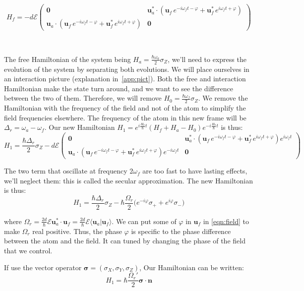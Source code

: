 \documentclass[10pt]{report}
\theoremstyle{plain}
\theoremstyle{definition}
\theoremstyle{remark}
\newcommand{\braket}[2]{\langle#1|#2\rangle}
\newcommand{\mat}[1]{\begin{pmatrix}#1\end{pmatrix}}
\newcommand{\bs}{\boldsymbol}
\begin{document}
\[ H_f = -d\mathcal{E} \mat{\bs 0 &
  \bs u_a^* \cdot (\bs u_f\, e^{-i\omega_f t-\varphi} + \bs u_f^*\,
  e^{i\omega_f t + \varphi})\\
\bs u_a \cdot (\bs u_f\, e^{-i\omega_f t-\varphi} + \bs u_f^*\,
  e^{i\omega_f t + \varphi}) & \bs 0
}\]

\

The free Hamiltonian of the system being $H_a = \frac{\hbar \omega_a}2 \sigma_Z$,
we'll need to express the evolution of the system by separating both evolutions.
We will place ourselves in an interaction picture (explanation
in~\cref{app:pict}). Both the free and interaction Hamiltonian make the state turn
around, and we want to see the difference between the two of them. Therefore, we
will remove $H_0 = \frac{\hbar \omega_f}2 \sigma_Z$. We remove the Hamiltonian
with the frequency of the field and not of the atom to simplify the field
frequencies elsewhere. The frequency of the atom in this new frame will be
$\Delta_r = \omega_a - \omega_f$.
Our new Hamiltonian $H_1 = e^{i\frac{H_0}\hbar t}(H_f + H_a - H_0)e^{-i\frac{H_0}\hbar t}$ is thus:
\[H_1 = \frac{\hbar \Delta_r}2 \sigma_Z -
  d\mathcal{E} \mat{\bs 0 &
    \bs u_a^* \cdot (\bs u_f\, e^{-i\omega_f t-\varphi} + \bs u_f^*\,
    e^{i\omega_f t + \varphi}) e^{i\omega_f t}\\
    \bs u_a \cdot (\bs u_f\, e^{-i\omega_f t-\varphi} + \bs u_f^*\,
    e^{i\omega_f t + \varphi}) e^{-i\omega_f t} & \bs 0
  }\]

The two term that oscillate at frequency $2\omega_f$ are too fast to have
lasting effects, we'll neglect them: this is called the secular approximation.
The new Hamiltonian is thus:
\begin{equation}\label{eqn:RamseyH}
H_1 = \frac{\hbar \Delta_r}2 \sigma_Z -\hbar \frac{\Omega_r}2
  \big(e^{-i\varphi}\sigma_+ + e^{i\varphi}\sigma_-\big)
\end{equation}

where $\Omega_r=\frac{2d}{\hbar}\mathcal{E}\bs u_a^* \cdot \bs u_f = \frac{2d}{\hbar}\mathcal{E}\braket{\bs u_a}{\bs u_f}$. We can put
some of $\varphi$ in $\bs u_f$ in \cref{eqn:field} to make $\Omega_r$ real
positive. Thus, the phase $\varphi$ is specific to the phase difference between the atom
and the field. It can tuned by changing the phase of the field that we control.

If use the vector operator $\bs \sigma = (\sigma_X,\sigma_Y,\sigma_Z)$, Our
Hamiltonian can be written:
\begin{equation}
H_1 = \hbar \frac{\Omega_r'}2 \bs \sigma \cdot \bs n
\end{equation}
\end{document}
